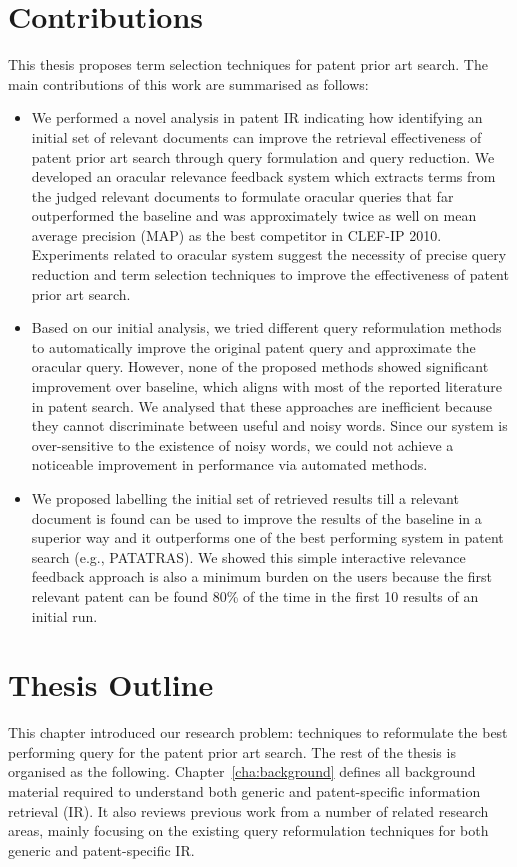 \section{Contributions}
\label{sec:Contributions}
This thesis proposes term selection techniques for patent prior art search.
The main contributions of this work are summarised as follows:
\begin{itemize}
\item We performed a novel analysis in patent IR indicating how identifying 
an initial set of relevant documents can improve the retrieval effectiveness of 
patent prior art search through query formulation and query reduction. 
We developed an oracular relevance feedback system which extracts terms from the 
judged relevant documents to formulate oracular queries that far outperformed the 
baseline and  was approximately twice 
as well on mean average precision (MAP) as the best competitor in CLEF-IP 2010. 
Experiments related to oracular system suggest the necessity of precise query reduction 
and term selection techniques to improve the effectiveness of patent prior art search.
\item Based on our initial analysis, we tried different query reformulation methods to 
automatically improve the original patent query and approximate the oracular query. 
However, none of the proposed methods showed significant improvement over baseline, 
which aligns with most of the reported literature in patent search. 
We analysed that these approaches are inefficient because they cannot discriminate between 
useful and noisy words. Since our system is over-sensitive to the existence of noisy words, 
we could not achieve a noticeable improvement in performance via automated methods.
\item We proposed labelling the initial set of retrieved results till a relevant document is 
found can be used to improve the results of the baseline in a superior way and it outperforms one of the 
best performing system in patent search (e.g., PATATRAS).
We showed this simple interactive relevance feedback approach is also a minimum burden on the users 
because the first relevant patent can be found 80\% of the time in the first 10 results of an initial run.
\end{itemize}
\section{Thesis Outline}
\label{sec:outline}
This chapter introduced our research problem: techniques to reformulate the best performing 
query for the patent prior art search. The rest of the thesis is organised as the following. 
Chapter~\ref{cha:background} defines all background material required to understand both 
generic and patent-specific information retrieval (IR). It also reviews previous work from a number
of related research areas, mainly focusing on the existing query reformulation techniques for both 
generic and patent-specific IR. 

